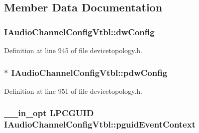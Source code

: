 \subsection{Member Data Documentation}
\subsubsection[{\texorpdfstring{dw\+Config}{dwConfig}}]{ I\+Audio\+Channel\+Config\+Vtbl\+::dw\+Config}\hypertarget{struct_i_audio_channel_config_vtbl_a06ea53f5bd6faf338de7b9afd46ded30}{}\label{struct_i_audio_channel_config_vtbl_a06ea53f5bd6faf338de7b9afd46ded30}


Definition at line 945 of file devicetopology.\+h.

\subsubsection[{\texorpdfstring{pdw\+Config}{pdwConfig}}]{$\ast$ I\+Audio\+Channel\+Config\+Vtbl\+::pdw\+Config}\hypertarget{struct_i_audio_channel_config_vtbl_ac7531b2c1a36febb9e7cad486ccd3fa9}{}\label{struct_i_audio_channel_config_vtbl_ac7531b2c1a36febb9e7cad486ccd3fa9}


Definition at line 951 of file devicetopology.\+h.

\subsubsection[{\texorpdfstring{pguid\+Event\+Context}{pguidEventContext}}]{ {\bf \+\_\+\+\_\+in\+\_\+opt} {\bf L\+P\+C\+G\+U\+ID} I\+Audio\+Channel\+Config\+Vtbl\+::pguid\+Event\+Context}\hypertarget{struct_i_audio_channel_config_vtbl_ab528962f5adee33caaa6d29a49e3cb3e}{}\label{struct_i_audio_channel_config_vtbl_ab528962f5adee33caaa6d29a49e3cb3e}


